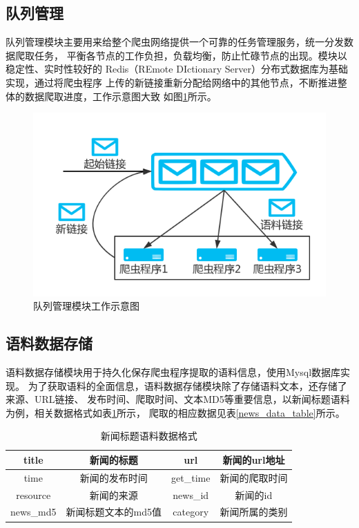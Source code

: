 \subsection{队列管理}
队列管理模块主要用来给整个爬虫网络提供一个可靠的任务管理服务，统一分发数据爬取任务，
平衡各节点的工作负担，负载均衡，防止忙碌节点的出现。模块以稳定性、实时性较好的
Redis（REmote DIctionary Server）分布式数据库为基础实现，通过将爬虫程序
上传的新链接重新分配给网络中的其他节点，不断推进整体的数据爬取进度，工作示意图大致
如图\ref{redis}所示。
\begin{figure}[h]
    \includegraphics[scale=0.5]{picture/redis.png}
    \caption{队列管理模块工作示意图}
    \label{redis}
\end{figure}
\subsection{语料数据存储}
语料数据存储模块用于持久化保存爬虫程序提取的语料信息，使用Mysql数据库实现。
为了获取语料的全面信息，语料数据存储模块除了存储语料文本，还存储了来源、URL链接、
发布时间、爬取时间、文本MD5等重要信息，以新闻标题语料为例，相关数据格式如表\ref{news_struct_table}所示，
爬取的相应数据见表\ref{news_data_table}所示。

\begin{table}[h]
    \caption{新闻标题语料数据格式}
    \begin{tabular}{|c|c|c|c|}
        \hline
        title & 新闻的标题 & url & 新闻的url地址 \\
        \hline
        time & 新闻的发布时间 & get\_time & 新闻的爬取时间 \\
        \hline
        resource & 新闻的来源 & news\_id & 新闻的id \\
        \hline
        news\_md5 & 新闻标题文本的md5值 & category & 新闻所属的类别  \\
        \hline
    \end{tabular}
    \label{news_struct_table}
    \end{table}

